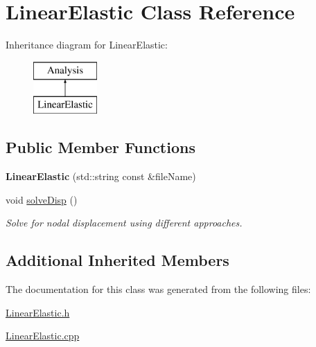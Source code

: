 \hypertarget{class_linear_elastic}{}\section{Linear\+Elastic Class Reference}
\label{class_linear_elastic}
Inheritance diagram for Linear\+Elastic\+:\begin{figure}[H]
\begin{center}
\leavevmode
\includegraphics[height=2.000000cm]{class_linear_elastic}
\end{center}
\end{figure}
\subsection*{Public Member Functions}
\begin{DoxyCompactItemize}
\item 
\mbox{\label{class_linear_elastic_af1b56916522c2f91f4f6e817ed63cfbe}} 
{\bfseries Linear\+Elastic} (std\+::string const \&file\+Name)
\item 
\mbox{\label{class_linear_elastic_add96aa6fdb7cbbbcef2dca1f31ca0779}} 
void \mbox{\hyperlink{class_linear_elastic_add96aa6fdb7cbbbcef2dca1f31ca0779}{solve\+Disp}} ()
\begin{DoxyCompactList}\small\item\em Solve for nodal displacement using different approaches. \end{DoxyCompactList}\end{DoxyCompactItemize}
\subsection*{Additional Inherited Members}


The documentation for this class was generated from the following files\+:\begin{DoxyCompactItemize}
\item 
\mbox{\hyperlink{_linear_elastic_8h}{Linear\+Elastic.\+h}}\item 
\mbox{\hyperlink{_linear_elastic_8cpp}{Linear\+Elastic.\+cpp}}\end{DoxyCompactItemize}
